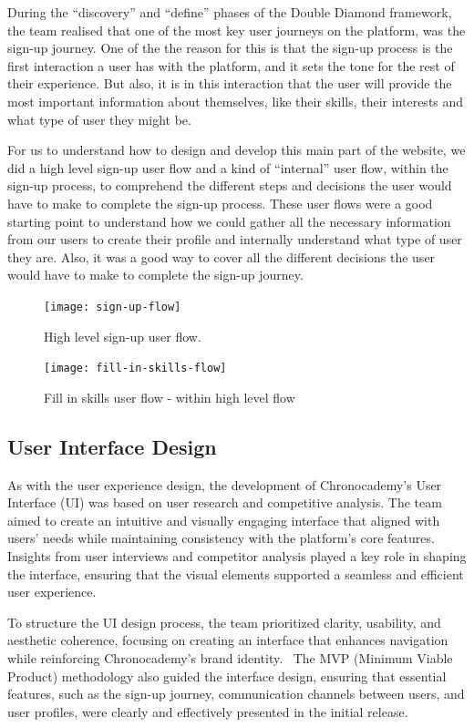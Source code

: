 During the ``discovery'' and ``define'' phases of the Double Diamond framework, the team realised that one of the most key user journeys on the platform, was the sign-up journey.
One of the the reason for this is that the sign-up process is the first interaction a user has with the platform, and it sets the tone for the rest of their experience.
But also, it is in this interaction that the user will provide the most important information about themselves, like their skills, their interests and what type of user they might be.

For us to understand how to design and develop this main part of the website, we did a high level sign-up user flow and a kind of ``internal'' user flow, within the sign-up process, to comprehend the different steps and decisions the user would have to make to complete the sign-up process.
These user flows were a good starting point to understand how we could gather all the necessary information from our users to create their profile and internally understand what type of user they are.
Also, it was a good way to cover all the different decisions the user would have to make to complete the sign-up journey.
\begin{figure}[h]
    \centering
    \texttt{[image: sign-up-flow]}
    \caption{High level sign-up user flow.}
    \label{fig:figure18}
\end{figure}
\newpage
\begin{figure}[h]
    \centering
    \texttt{[image: fill-in-skills-flow]}
    \caption{Fill in skills user flow - within high level flow}
    \label{fig:figure19}
\end{figure}

\subsection{User Interface Design}\label{subsec:user-interface-design}

As with the user experience design, the development of Chronocademy’s User Interface (UI) was based on user research and competitive analysis.
The team aimed to create an intuitive and visually engaging interface that aligned with users’ needs while maintaining consistency with the platform’s core features.
Insights from user interviews and competitor analysis played a key role in shaping the interface, ensuring that the visual elements supported a seamless and efficient user experience.

To structure the UI design process, the team prioritized clarity, usability, and aesthetic coherence, focusing on creating an interface that enhances navigation while reinforcing Chronocademy’s brand identity. \ The MVP (Minimum Viable Product) methodology also guided the interface design, ensuring that essential features, such as the sign-up journey, communication channels between users, and user profiles, were clearly and effectively presented in the initial release.

